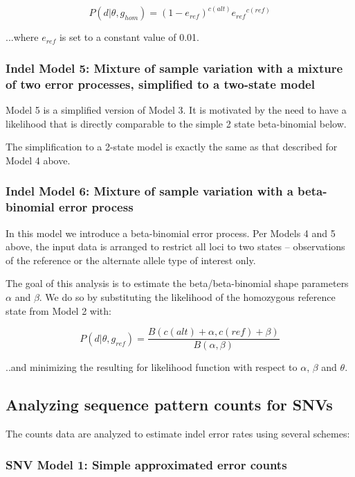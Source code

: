 \documentclass{article}
\begin{document}
\begin{equation*}
P (d \vert \theta, g_{hom}) = (1-e_{ref})^{c(alt)} {e_{ref}}^{c(ref)}
\end{equation*}

...where $e_{ref}$ is set to a constant value of 0.01.

\subsubsection{Indel Model 5: Mixture of sample variation with a mixture of two error processes, simplified to a two-state model}

Model 5 is a simplified version of Model 3. It is motivated by the need to have a likelihood that is directly comparable to the simple 2 state beta-binomial below.

The simplification to a 2-state model is exactly the same as that described for Model 4 above.

\subsubsection{Indel Model 6: Mixture of sample variation with a beta-binomial error process}

In this model we introduce a beta-binomial error process. Per Models 4 and 5 above, the input data is arranged to restrict all loci to two states -- observations of the reference or the alternate allele type of interest only.

The goal of this analysis is to estimate the beta/beta-binomial shape parameters $\alpha$ and $\beta$. We do so by substituting the likelihood of the homozygous reference state from Model 2 with:

\begin{equation}
P ( d \vert \theta, g_{ref}) = \frac{B(c(alt)+\alpha,c(ref)+\beta)}{B(\alpha,\beta)}
\end{equation}

..and minimizing the resulting for likelihood function with respect to $\alpha$, $\beta$ and $\theta$.


\subsection{Analyzing sequence pattern counts for SNVs}

The counts data are analyzed to estimate indel error rates using several schemes:

\subsubsection{SNV Model 1: Simple approximated error counts}
\end{document}
